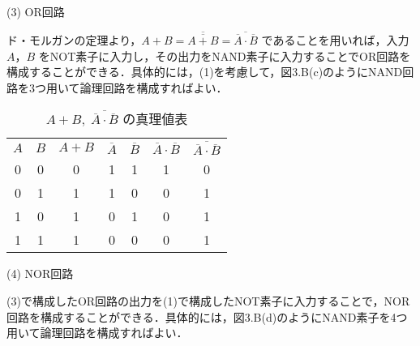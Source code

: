 \vspace{7mm}
\noindent
(3) OR回路 \vspace{2mm}

ド・モルガンの定理より，$A + B = \overline{\overline{A + B}} = \overline{\overline{A} \cdot \overline{B}}$ であることを用いれば，入力 $A$，$B$ をNOT素子に入力し，その出力をNAND素子に入力することでOR回路を構成することができる．具体的には，(1)を考慮して，図3.B(c)のようにNAND回路を3つ用いて論理回路を構成すればよい．

\newpage
\begin{table}[!h]
    \caption{$A + B,\; \overline{\overline{A} \cdot \overline{B}}$ の真理値表}
    \label{tbl03}
    \begin{center}
        \begin{tabular}{|c|c||c|c|c|c|c|}
            \hline
            $A$ & $B$ & $A + B$ & $\overline{A}$ & $\overline{B}$ & $\overline{A} \cdot \overline{B}$ & $\overline{\overline{A} \cdot \overline{B}}$ \\
            \hhline{|=|=#=|=|=|=|=|}
            0   & 0   & 0       & 1              & 1              & 1                                 & 0                                            \\
            \hline
            0   & 1   & 1       & 1              & 0              & 0                                 & 1                                            \\
            \hline
            1   & 0   & 1       & 0              & 1              & 0                                 & 1                                            \\
            \hline
            1   & 1   & 1       & 0              & 0              & 0                                 & 1                                            \\
            \hline
        \end{tabular}
    \end{center}
\end{table}

\vspace{7mm}
\noindent
(4) NOR回路 \vspace{2mm}

(3)で構成したOR回路の出力を(1)で構成したNOT素子に入力することで，NOR回路を構成することができる．具体的には，図3.B(d)のようにNAND素子を4つ用いて論理回路を構成すればよい．

\vspace{7mm}

